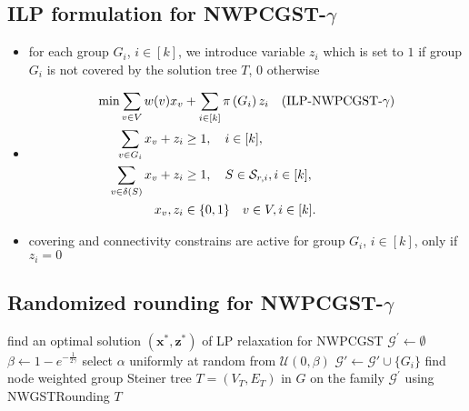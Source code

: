 \documentclass{beamer}
\begin{document}
\subsection*{ILP formulation for NWPCGST-$\gamma$}
\begin{frame}{\insertsection}{\insertsubsection}
    \begin{itemize}
        \item for each group $G_i$, $i\in\left[k\right]$, we introduce variable $z_i$ which is set to $1$ if group $G_i$ is not covered by the solution tree $T$, $0$ otherwise
        \item[]
        \begin{align*}
            \mbox{min} \sum_{v\in V}w(v)x_v&\notag + \sum_{i\in\left[k\right]}{\pi\left(G_i\right)z_i} \quad\mbox{(ILP-NWPCGST-$\gamma$)}\\
            \sum_{v\in G_i} x_v + z_i &\geq 1,  \quad i\in[k],\\
            \sum_{v\in \delta(S)} x_v + z_i  &\geq 1, \quad S\in \mathcal{S}_{r,i}, i\in [k],\\
            x_v, z_i & \in \{0,1\} \quad v\in V, i\in [k].
        \end{align*}
        \item covering and connectivity constrains are active for group $G_i$, $i\in [k]$, only if $z_i=0$
    \end{itemize}
\end{frame}

\subsection*{Randomized rounding for NWPCGST-$\gamma$}
\begin{frame}{\insertsection}{\insertsubsection}
    \begin{algorithmic}[1]
           \State find an optimal solution $\left(\mathbf{x}^\ast,\mathbf{z}^\ast\right)$ of LP relaxation for NWPCGST
           \State $\mathcal{G}^\prime\gets\emptyset$
           \State $\beta\gets 1-e^{-\frac{1}{2\gamma}}$
           \State select $\alpha$ uniformly at random from $\mathcal{U}\left(0,\beta\right)$
                    \State $\mathcal{G}'\gets \mathcal{G}'\cup\{G_i\}$
                \EndIf
           \EndFor
           \State find node weighted group Steiner tree $T=\left(V_T,E_T\right)$ in $G$ on the family $\mathcal{G}^\prime$ using \textrm{NWGSTRounding}
           \State \Return $T$
        \EndProcedure
        \end{algorithmic}
\end{frame}
\end{document}
